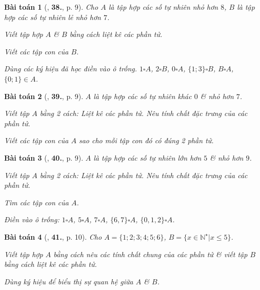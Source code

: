 \documentclass{article}
\numberwithin{equation}{section}
\newtheorem{baitoan}{Bài toán}[section]
\begin{document}
\begin{baitoan}[\cite{Trong_Toan_6_2021}, \textbf{38.}, p. 9]
	Cho $A$ là tập hợp các số tự nhiên nhỏ hơn $8$, $B$ là tập hợp các số tự nhiên lẻ nhỏ hơn $7$.
	\begin{enumerate*}
		\item Viết tập hợp $A$ \& $B$ bằng cách liệt kê các phần tử.
		\item Viết các tập con của $B$.
		\item Dùng các ký hiệu đã học điền vào ô trống. $1\square A$, $2\square B$, $0\square A$, $\{1;3\}\square B$, $B\square A$, $\{0;1\}\in A$.
	\end{enumerate*}
\end{baitoan}

\begin{baitoan}[\cite{Trong_Toan_6_2021}, \textbf{39.}, p. 9]
	$A$ là tập hợp các số tự nhiên khác $0$ \& nhỏ hơn $7$.
	\begin{enumerate*}
		\item Viết tập $A$ bằng 2 cách: Liệt kê các phần tử. Nêu tính chất đặc trưng của các phần tử.
		\item Viết các tập con của $A$ sao cho mỗi tập con đó có đúng 2 phần tử.
	\end{enumerate*}
\end{baitoan}

\begin{baitoan}[\cite{Trong_Toan_6_2021}, \textbf{40.}, p. 9]
	$A$ là tập hợp các số tự nhiên lớn hơn $5$ \& nhỏ hơn $9$.
	\begin{enumerate*}
		\item Viết tập $A$ bằng 2 cách: Liệt kê các phần tử. Nêu tính chất đặc trưng của các phần tử.
		\item Tìm các tập con của $A$.
		\item Điền vào ô trống: $1\square A$, $5\square A$, $7\square A$, $\{6,7\}\square A$, $\{0,1,2\}\square A$.
	\end{enumerate*}
\end{baitoan}

\begin{baitoan}[\cite{Trong_Toan_6_2021}, \textbf{41.}, p. 10]
	Cho $A = \{1;2;3;4;5;6\}$, $B = \{x\in\mathbb{N}^\star|x\le 5\}$.
	\begin{enumerate*}
		\item Viết tập hợp $A$ bằng cách nêu các tính chất chung của các phần tử \& viết tập $B$ bằng cách liệt kê các phần tử.
		\item Dùng ký hiệu để biểu thị sự quan hệ giữa $A$ \& $B$.
	\end{enumerate*}
\end{baitoan}
\end{document}
